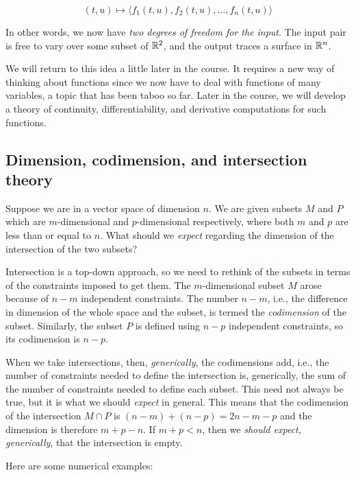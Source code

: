\documentclass[10pt]{amsart}
\begin{document}
$$(t,u) \mapsto \langle f_1(t,u), f_2(t,u), \dots, f_n(t,u) \rangle$$

In other words, we now have {\em two degrees of freedom for the
input}. The input pair is free to vary over some subset of $\mathbb{R}^2$, and
the output traces a surface in $\mathbb{R}^n$.

We will return to this idea a little later in the course. It requires
a new way of thinking about functions since we now have to deal with
functions of many variables, a topic that has been taboo so far. Later
in the course, we will develop a theory of continuity,
differentiability, and derivative computations for such functions.

\subsection{Dimension, codimension, and intersection theory}

Suppose we are in a vector space of dimension $n$. We are given
subsets $M$ and $P$ which are $m$-dimensional and $p$-dimensional
respectively, where both $m$ and $p$ are less than or equal to
$n$. What should we {\em expect} regarding the dimension of the
intersection of the two subsets?

Intersection is a top-down approach, so we need to rethink of the
subsets in terms of the constraints imposed to get them. The
$m$-dimensional subset $M$ arose because of $n - m$ independent
constraints. The number $n - m$, i.e., the difference in dimension of
the whole space and the subset, is termed the {\em codimension} of the
subset. Similarly, the subset $P$ is defined using $n - p$ independent
constraints, so its codimension is $n - p$.

When we take intersections, then, {\em generically}, the codimensions
add, i.e., the number of constraints needed to define the intersection
is, generically, the sum of the number of constraints needed to define
each subset. This need not always be true, but it is what we should
{\em expect} in general. This means that the codimension of the
intersection $M \cap P$ is $(n - m) + (n - p) = 2n - m - p$ and the
dimension is therefore $m + p - n$. If $m + p < n$, then we {\em
should expect, generically}, that the intersection is empty.

Here are some numerical examples:
\end{document}
